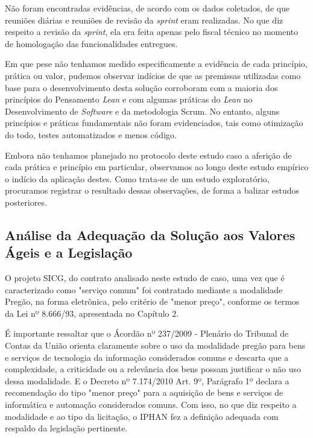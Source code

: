 Não foram encontradas evidências, de acordo com os dados coletados, de que reuniões diárias e reuniões de revisão da \textit{sprint} eram realizadas. No que diz respeito a revisão da \textit{sprint}, ela era feita apenas pelo fiscal técnico no momento de homologação das funcionalidades entregues.

Em que pese não tenhamos medido especificamente a evidência de cada princípio, prática ou valor, pudemos observar indícios de que as premissas utilizadas como base para o desenvolvimento desta solução corroboram com a maioria dos princípios do Pensamento \textit{Lean} e com algumas práticas do \textit{Lean} no Desenvolvimento de \textit{Software} e da metodologia Scrum. No entanto, alguns princípios e práticas fundamentais não foram evidenciados, tais como otimização do todo, testes automatizados e menos código. 

Embora não tenhamos planejado no protocolo deste estudo caso a aferição de cada prática e princípio em particular, observamos ao longo deste estudo empírico o indício da aplicação destes. Como trata-se de um estudo exploratório, procuramos registrar o resultado dessas observações, de forma a balizar estudos posteriores.


\subsection[Análise da Adequação da Solução aos Valores Ágeis e a Legislação]{Análise da Adequação da Solução aos Valores Ágeis e a Legislação}

O projeto SICG, do contrato analisado neste estudo de caso, uma vez que é caracterizado como "serviço comum" foi contratado mediante a modalidade Pregão, na forma eletrônica, pelo critério de "menor preço", conforme os termos da Lei nº 8.666/93, apresentada no Capítulo 2.

É importante ressaltar que o Ácordão nº 237/2009 - Plenário do Tribunal de Contas da União orienta claramente sobre o uso da modalidade pregão para bens e serviços de tecnologia da informação considerados comuns e descarta que a complexidade, a criticidade ou a relevância dos bens possam justificar o não uso dessa modalidade.  E o Decreto nº 7.174/2010 Art. 9º, Parágrafo 1º declara a recomendação do tipo "menor preço" para a aquisição de bens e serviços de informática e automação considerados comuns. Com isso, no que diz respeito a modalidade e ao tipo da licitação, o IPHAN fez a definição adequada com respaldo da legislação pertinente. 

